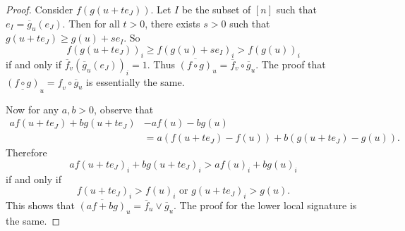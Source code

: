 \documentclass[10pt,reqno]{amsart}
\newcommand{\R}{\mathbb{R}}
\newcommand{\supp}{\operatorname{supp}}
\theoremstyle{plain}
\theoremstyle{definition}
\numberwithin{equation}{section}
\begin{document}
\begin{proof}
Consider $f(g(u + te_J))$.  Let $I$ be the subset of $[n]$ such that $e_I = \overline{g}_u(e_J)$.  Then for all $t > 0$, there exists $s > 0$ such that $g(u+te_J) \ge g(u) + se_I$.  So 
$$f(g(u+te_J))_i \ge f(g(u) + s e_I)_i > f(g(u))_i$$
if and only if $\overline{f}_v(\overline{g}_u(e_J))_i  = 1$.  Thus $\overline{(f \circ g)}_u = \overline{f}_v \circ \overline{g}_u$. The proof that $\underline{(f \circ g)}_u = \underline{f}_v \circ \overline{g}_u$ is essentially the same. 

Now for any $a, b > 0$, observe that 
\begin{align*}
af(u + te_J) + bg(u+te_J) &- af(u) - bg(u)  \\ 
&= a(f(u+te_J) - f(u)) + b (g(u+te_J) - g(u)).
\end{align*}
Therefore 
$$af(u + te_J)_i + bg(u+te_J)_i > af(u)_i + bg(u)_i$$ 
if and only if  
$$f(u+te_J)_i > f(u)_i \text{ or } g(u+te_J)_i > g(u).$$
This shows that $\overline{(af+bg)}_u = \overline{f}_u \vee \overline{g}_u$.  The proof for the lower local signature is the same. 
\end{proof}

\end{document}
